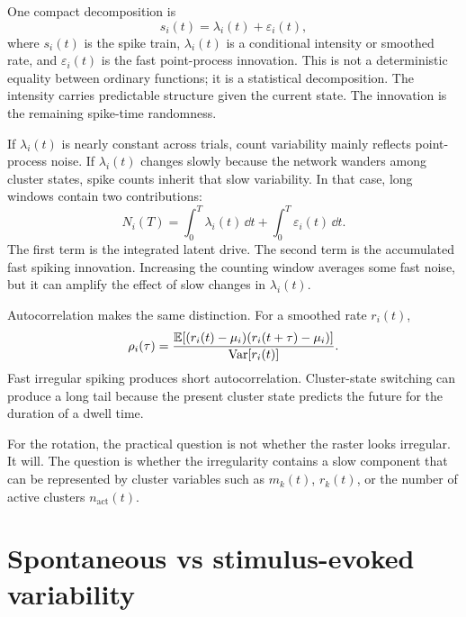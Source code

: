 One compact decomposition is
%
\begin{equation}
  s_i(t)
  =
  \lambda_i(t)
  +
  \varepsilon_i(t),
  \label{eq:spike-train-rate-noise-decomposition}
\end{equation}
%
where $s_i(t)$ is the spike train, $\lambda_i(t)$ is a conditional intensity or smoothed rate, and $\varepsilon_i(t)$ is the fast point-process innovation. This is not a deterministic equality between ordinary functions; it is a statistical decomposition. The intensity carries predictable structure given the current state. The innovation is the remaining spike-time randomness.

If $\lambda_i(t)$ is nearly constant across trials, count variability mainly reflects point-process noise. If $\lambda_i(t)$ changes slowly because the network wanders among cluster states, spike counts inherit that slow variability. In that case, long windows contain two contributions:
%
\begin{equation}
  N_i(T)
  =
  \int_0^T \lambda_i(t)\,\dd t
  +
  \int_0^T \varepsilon_i(t)\,\dd t .
  \label{eq:count-slow-fast-contributions}
\end{equation}
%
The first term is the integrated latent drive. The second term is the accumulated fast spiking innovation. Increasing the counting window averages some fast noise, but it can amplify the effect of slow changes in $\lambda_i(t)$.

Autocorrelation makes the same distinction. For a smoothed rate $r_i(t)$,
%
\begin{equation}
  \rho_i(\tau)
  =
  \frac{\mathbb{E}[(r_i(t)-\mu_i)(r_i(t+\tau)-\mu_i)]}{\operatorname{Var}[r_i(t)]}.
  \label{eq:chapter1-autocorrelation}
\end{equation}
%
Fast irregular spiking produces short autocorrelation. Cluster-state switching can produce a long tail because the present cluster state predicts the future for the duration of a dwell time.

For the rotation, the practical question is not whether the raster looks irregular. It will. The question is whether the irregularity contains a slow component that can be represented by cluster variables such as $m_k(t)$, $r_k(t)$, or the number of active clusters $n_{\mathrm{act}}(t)$.

\section{Spontaneous vs stimulus-evoked variability}
\label{sec:spontaneous-vs-stimulus-evoked-variability}

